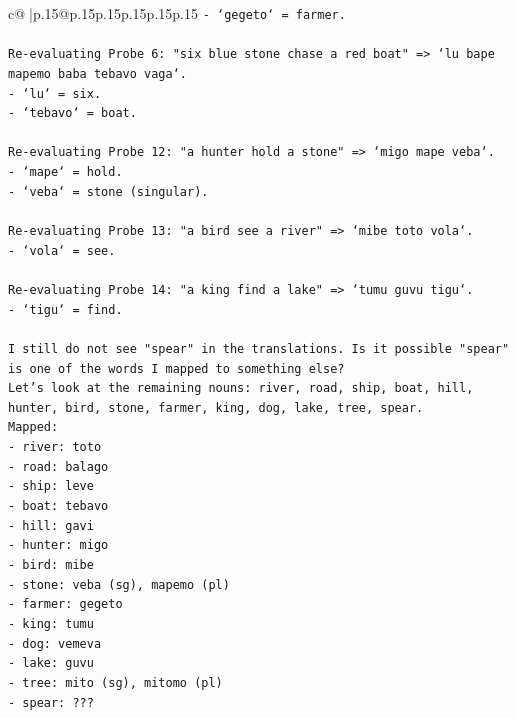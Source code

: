 \documentclass{article}
\begin{document}
{\begin{supertabular}{c@{$\;$}|p{.15\linewidth}@{}p{.15\linewidth}p{.15\linewidth}p{.15\linewidth}p{.15\linewidth}p{.15\linewidth}}
{{{\texttt{{-} `gegeto` = farmer.} \\
\\ 
\texttt{Re{-}evaluating Probe 6: "six blue stone chase a red boat" => `lu bape mapemo baba tebavo vaga`.} \\
\texttt{{-} `lu` = six.} \\
\texttt{{-} `tebavo` = boat.} \\
\\ 
\texttt{Re{-}evaluating Probe 12: "a hunter hold a stone" => `migo mape veba`.} \\
\texttt{{-} `mape` = hold.} \\
\texttt{{-} `veba` = stone (singular).} \\
\\ 
\texttt{Re{-}evaluating Probe 13: "a bird see a river" => `mibe toto vola`.} \\
\texttt{{-} `vola` = see.} \\
\\ 
\texttt{Re{-}evaluating Probe 14: "a king find a lake" => `tumu guvu tigu`.} \\
\texttt{{-} `tigu` = find.} \\
\\ 
\texttt{I still do not see "spear" in the translations. Is it possible "spear" is one of the words I mapped to something else?} \\
\texttt{Let's look at the remaining nouns: river, road, ship, boat, hill, hunter, bird, stone, farmer, king, dog, lake, tree, spear.} \\
\texttt{Mapped:} \\
\texttt{{-} river: toto} \\
\texttt{{-} road: balago} \\
\texttt{{-} ship: leve} \\
\texttt{{-} boat: tebavo} \\
\texttt{{-} hill: gavi} \\
\texttt{{-} hunter: migo} \\
\texttt{{-} bird: mibe} \\
\texttt{{-} stone: veba (sg), mapemo (pl)} \\
\texttt{{-} farmer: gegeto} \\
\texttt{{-} king: tumu} \\
\texttt{{-} dog: vemeva} \\
\texttt{{-} lake: guvu} \\
\texttt{{-} tree: mito (sg), mitomo (pl)} \\
\texttt{{-} spear: ???} \\
}}}
\end{supertabular}}
\end{document}
